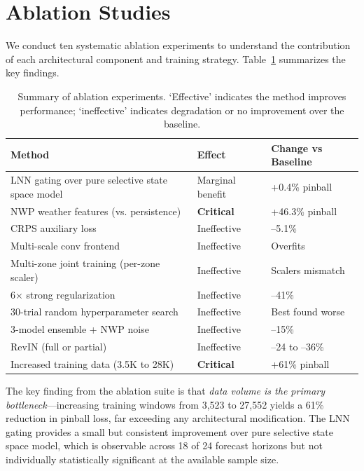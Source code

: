 \documentclass[review]{elsarticle}
\begin{document}
\section{Ablation Studies}

We conduct ten systematic ablation experiments to understand the contribution of each architectural component and training strategy. Table~\ref{tab:ablation} summarizes the key findings.

\begin{table}[H]
\centering
\caption{Summary of ablation experiments. `Effective' indicates the method improves performance; `ineffective' indicates degradation or no improvement over the baseline.}
\label{tab:ablation}
\begin{tabular}{@{}p{}ll@{}}
\toprule
\textbf{Method} & \textbf{Effect} & \textbf{Change vs Baseline} \\
\midrule
LNN gating over pure selective state space model & Marginal benefit & +0.4\% pinball \\
NWP weather features (vs. persistence) & \textbf{Critical} & +46.3\% pinball \\
CRPS auxiliary loss & Ineffective & --5.1\% \\
Multi-scale conv frontend & Ineffective & Overfits \\
Multi-zone joint training (per-zone scaler) & Ineffective & Scalers mismatch \\
6$\times$ strong regularization & Ineffective & --41\% \\
30-trial random hyperparameter search & Ineffective & Best found worse \\
3-model ensemble + NWP noise & Ineffective & --15\% \\
RevIN (full or partial) & Ineffective & --24 to --36\% \\
Increased training data (3.5K to 28K) & \textbf{Critical} & +61\% pinball \\
\bottomrule
\end{tabular}
\end{table}

The key finding from the ablation suite is that \emph{data volume is the primary bottleneck}---increasing training windows from 3,523 to 27,552 yields a 61\% reduction in pinball loss, far exceeding any architectural modification. The LNN gating provides a small but consistent improvement over pure selective state space model, which is observable across 18 of 24 forecast horizons but not individually statistically significant at the available sample size.
\end{document}
